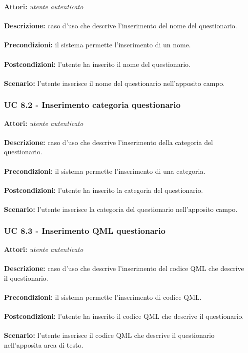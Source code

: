\documentclass[a4paper,11pt]{article}
\begin{document}
\textbf{Attori:} \textit{utente autenticato}
\\ \\
\textbf{Descrizione:} caso d'uso che descrive l'inserimento del nome del questionario.\\
\\
\textbf{Precondizioni:} il sistema permette l'inserimento di un nome.\\
\\
\textbf{Postcondizioni:} l’utente ha inserito il nome del questionario.\\
\\
\textbf{Scenario:} l’utente inserisce il nome del questionario nell'apposito campo.\\


\subsubsection{UC 8.2 - Inserimento categoria questionario}

\textbf{Attori:} \textit{utente autenticato}
\\ \\
\textbf{Descrizione:} caso d'uso che descrive l'inserimento della categoria del questionario.\\
\\
\textbf{Precondizioni:} il sistema permette l'inserimento di una categoria.\\
\\
\textbf{Postcondizioni:} l’utente ha inserito la categoria del questionario.\\
\\
\textbf{Scenario:} l’utente inserisce la categoria del questionario nell'apposito campo.\\


\subsubsection{UC 8.3 - Inserimento QML questionario}

\textbf{Attori:} \textit{utente autenticato}
\\ \\
\textbf{Descrizione:} caso d'uso che descrive l'inserimento del codice QML che descrive il questionario.\\
\\
\textbf{Precondizioni:} il sistema permette l'inserimento di codice QML.\\
\\
\textbf{Postcondizioni:} l’utente ha inserito il codice QML che descrive il questionario.\\
\\
\textbf{Scenario:} l’utente inserisce il codice QML che descrive il questionario nell'apposita area di testo.\\
\end{document}
